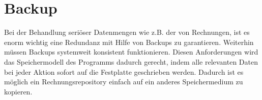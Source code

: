 
\section{Backup}

Bei der Behandlung seriöser Datenmengen wie z.B. der von Rechnungen, ist es enorm wichtig eine
Redundanz mit Hilfe von Backups zu garantieren. Weiterhin müssen Backups systemweit konsistent funktionieren.
Diesen Anforderungen wird das Speichermodell des Programms dadurch gerecht, indem alle relevanten Daten bei jeder
Aktion sofort auf die Festplatte geschrieben werden. Dadurch ist es möglich ein Rechnungsrepository einfach auf
ein anderes Speichermedium zu kopieren.


